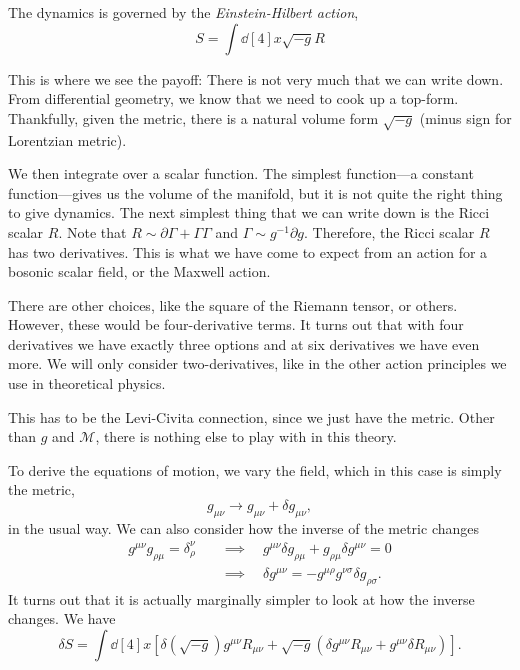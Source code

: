 The dynamics is governed by the \emph{Einstein-Hilbert action},
\begin{equation}
  S = \int \dd[4]{x} \sqrt{-g} R
\end{equation}
\begin{leftbar}
  \begin{remark}
    This is where we see the payoff: There is not very much that we can write down.
    From differential geometry, we know that we need to cook up a top-form. Thankfully, given the metric, there is a natural volume form $\sqrt{-g}$ (minus sign for Lorentzian metric).

    We then integrate over a scalar function. The simplest function---a constant function---gives us the volume of the manifold, but it is not quite the right thing to give dynamics.
    The next simplest thing that we can write down is the Ricci scalar $R$.
    Note that $R \sim \partial\Gamma + \Gamma \Gamma$ and $\Gamma \sim g^{-1} \partial g$. Therefore, the Ricci scalar $R$ has two derivatives.
    This is what we have come to expect from an action for a bosonic scalar field, or the Maxwell action.

    There are other choices, like the square of the Riemann tensor, or others. However, these would be four-derivative terms. 
    It turns out that with four derivatives we have exactly three options and at six derivatives we have even more.
    We will only consider two-derivatives, like in the other action principles we use in theoretical physics.
  \end{remark}
\end{leftbar}
\begin{leftbar}
  \begin{remark}
    This has to be the Levi-Civita connection, since we just have the metric. Other than $g$ and $\mathcal{M}$, there is nothing else to play with in this theory.
  \end{remark}
\end{leftbar}
To derive the equations of motion, we vary the field, which in this case is simply the metric,
\begin{equation}
  g_{\mu\nu} \to g_{\mu\nu} + \delta g_{\mu\nu},
\end{equation}
in the usual way.
We can also consider how the inverse of the metric changes
\begin{align}
  g^{\mu\nu} g_{\rho\mu} = \delta^{\nu}_{\rho} \quad &\implies \quad g^{\mu\nu} \delta g_{\rho\mu} + g_{\rho\mu} \delta g^{\mu\nu} = 0 \\
	      &\implies \quad \delta g^{\mu\nu} = - g^{\mu\rho} g^{\nu\sigma} \delta g_{\rho\sigma}.
\end{align}
It turns out that it is actually marginally simpler to look at how the inverse changes.
We have
\begin{equation}
  \delta S = \int \dd[4]{x} \left[  \delta (\sqrt{-g}) g^{\mu\nu} R_{\mu\nu} + \sqrt{-g} \left( \delta g^{\mu\nu} R_{\mu\nu} + g^{\mu\nu} \delta R_{\mu\nu}\right) \right].
\end{equation}

